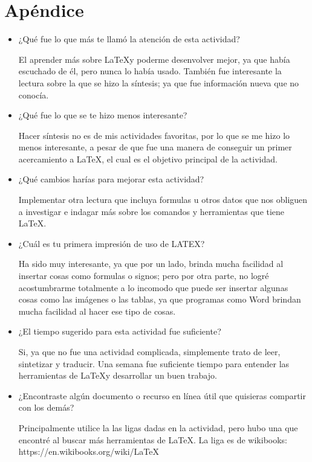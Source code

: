\documentclass{article}
\begin{document}
\section{Apéndice}
\begin{itemize}
\item  ¿Qué fue lo que más te llamó la atención de esta actividad?

El aprender más sobre \LaTeX y poderme desenvolver mejor, ya que había escuchado de él, pero nunca lo había usado. También fue interesante la lectura sobre la que se hizo la síntesis; ya que fue información nueva que no conocía.

\item  ¿Qué fue lo que se te hizo menos interesante?

Hacer síntesis no es de mis actividades favoritas, por lo que se me hizo lo menos interesante, a pesar de que fue una manera de conseguir un primer acercamiento a \LaTeX, el cual es el objetivo principal de la actividad. 

\item  ¿Qué cambios harías para mejorar esta actividad?

Implementar otra lectura que incluya formulas u otros datos que nos obliguen a investigar e indagar más sobre los comandos y herramientas que tiene \LaTeX.

\item  ¿Cuál es tu primera impresión de uso de LATEX?

Ha sido muy interesante, ya que por un lado, brinda mucha facilidad al insertar cosas como formulas o signos; pero por otra parte, no logré acostumbrarme totalmente a lo incomodo que puede ser insertar algunas cosas como las imágenes o las tablas, ya que programas como Word brindan mucha facilidad al hacer ese tipo de cosas.

\item  ¿El tiempo sugerido para esta actividad fue suficiente? 

Si, ya que no fue una actividad complicada, simplemente trato de leer, sintetizar y traducir. Una semana fue suficiente tiempo para entender las herramientas de \LaTeX y desarrollar un buen trabajo. 

\item  ¿Encontraste algún documento o recurso en línea útil que quisieras compartir con los demás?  

Principalmente utilice la las ligas dadas en la actividad, pero hubo una que encontré al buscar más herramientas de \LaTeX. La liga es de wikibooks: https://en.wikibooks.org/wiki/LaTeX

\end{itemize}
\end{document}
